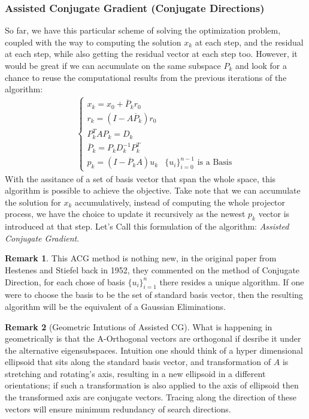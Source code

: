 \documentclass[]{article}
\theoremstyle{definition}
\newtheorem{remark}{Remark}[subsection]
\begin{document}
        \subsubsection{Assisted Conjugate Gradient (Conjugate Directions)}
            So far, we have this particular scheme of solving the optimization problem, coupled with the way to computing the solution $x_k$ at each step, and the residual at each step, while also getting the residual vector at each step too. However, it would be great if we can accumulate on the same subspace $P_k$ and look for a chance to reuse the computational results from the previous iterations of the algorithm: 
            \begin{align}
                \begin{cases}
                    x_k = x_0 + \overline{P}_k r_0
                    \\
                    r_k = (I - A\overline{P}_k) r_0
                    \\
                    P^T_kAP_k = D_k
                    \\
                    \overline{P}_k = P_kD^{-1}_kP_k^T
                    \\
                    p_k = (I - \overline{P}_kA)u_k & \{u_i\}_{i = 0}^{n - 1} \text{ is a Basis}
                \end{cases}
            \end{align}
            With the assitance of a set of basis vector that span the whole space, this algorithm is possible to achieve the objective. Take note that we can accumulate the solution for $x_k$ accumulatively, instead of computing the whole projector process, we have the choice to update it recursively as the newest $p_k$ vector is introduced at that step. Let's Call this formulation of the algorithm: \textit{Assisted Conjugate Gradient}. 
            \begin{remark}
                This ACG method is nothing new, in the original paper from Hestenes and Stiefel back in 1952, they commented on the method of Conjugate Direction, for each chose of basis $\{u_i\}_{i = 1}^n$ there resides a unique algorithm. If one were to choose the basis to be the set of standard basis vector, then the resulting algorithm will be the equivalent of a Gaussian Eliminations. 
            \end{remark}
            \begin{remark}[Geometric Intutions of Assisted CG]
                What is happening in geometrically is that the A-Orthogonal vectors are orthogonal if desribe it under the alternative eigensubspaces. Intuition one should think of a hyper dimensional ellipsoid that sits along the standard basis vector, and transformation of $A$ is stretching and rotating's axis, resulting in a new ellipsoid in a different orientations; if such a transformation is also applied to the axis of ellipsoid then the transformed axis are conjugate vectors. Tracing along the direction of these vectors will ensure minimum redundancy of search directions. 
            \end{remark}
\end{document}
